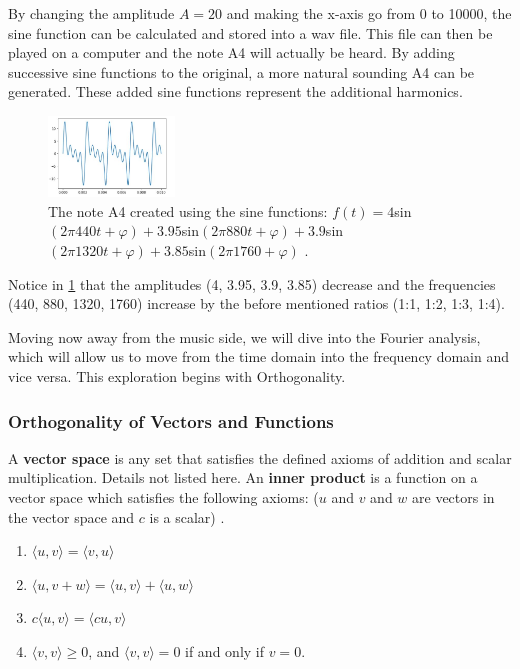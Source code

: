 \documentclass[10pt]{article}
\begin{document}
By changing the amplitude $A = 20$ and making the x-axis go from 0 to 10000, the sine function can be calculated and stored into a wav file. This file can then be played on a computer and the note A4 will actually be heard. By adding successive sine functions to the original, a more natural sounding A4 can be generated. These added sine functions represent the additional harmonics.

 \begin{figure}[h]
    \centering
    \includegraphics[width=0.3\textwidth]{A4with4harmonics.jpg}
    \caption{The note A4 created using the sine functions: $f(t)=4$sin$(2\pi440t+\varphi) + 3.95$sin$(2\pi880t+\varphi) + 3.9$sin$(2\pi1320t+\varphi) + 3.85$sin$(2\pi1760+\varphi)$ .} 
    \label{fig:sine python 2}
\end{figure}

Notice in \ref{fig:sine python 2} that the amplitudes (4, 3.95, 3.9, 3.85) decrease and the frequencies (440, 880, 1320, 1760) increase by the before mentioned ratios (1:1, 1:2, 1:3, 1:4).

Moving now away from the music side, we will dive into the Fourier analysis, which will allow us to move from the time domain into the frequency domain and vice versa. This exploration begins with Orthogonality.



\subsubsection{Orthogonality of Vectors and Functions}
\hspace{\parindent} A \textbf{vector space} is any set that satisfies the defined axioms of addition and scalar multiplication. Details not listed here. An \textbf{inner product} is a function on a vector space which satisfies the following axioms: ($u$ and $v$ and $w$ are vectors in the vector space and $c$ is a scalar) \cite{shields1968linearalgebra}.
\begin{enumerate}
    \item $\langle u, v \rangle = \langle v, u \rangle$
    \item $\langle u, v + w \rangle = \langle u, v \rangle + \langle u, w \rangle$
    \item $c \langle u, v \rangle = \langle cu, v \rangle$
    \item $\langle v, v \rangle \geq 0$, and $\langle v, v \rangle = 0$ if and only if $v = 0.$
\end{enumerate}
\end{document}
